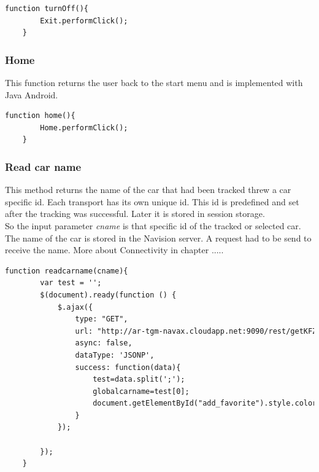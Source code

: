 \begin{lstlisting}[language=html, caption= 
Turn off funtion,captionpos=b]
function turnOff(){
        Exit.performClick();
    }
\end{lstlisting}


\subsubsection{Home}
This function returns the user back to the start menu and is implemented with Java Android.

\begin{lstlisting}[language=html, caption= 
Home function,captionpos=b]
function home(){
        Home.performClick();
    }
\end{lstlisting}


\subsubsection{Read car name}
This method returns the name of the car that had been tracked threw a car specific id. Each transport has its own unique id. This id is predefined and set after the tracking was successful. Later it is stored in session storage.
\\  
So the input parameter \textit{cname} is that specific id of the tracked or selected car. The name of the car is stored in the Navision server. A request had to be send to receive the name. More about Connectivity in chapter .....
\\


\begin{lstlisting}[language=html, caption= 
Read car name function,captionpos=b]
function readcarname(cname){
        var test = '';
        $(document).ready(function () {
            $.ajax({
                type: "GET",
                url: "http://ar-tgm-navax.cloudapp.net:9090/rest/getKFZInfo/"+cname+"/ac73f229f1fb88a8719e5f6d295bee45?callback=?",
                async: false,
                dataType: 'JSONP',
                success: function(data){
                    test=data.split(';');
                    globalcarname=test[0];
					document.getElementById("add_favorite").style.color="black";
                }
            });

        });
    }
\end{lstlisting}

